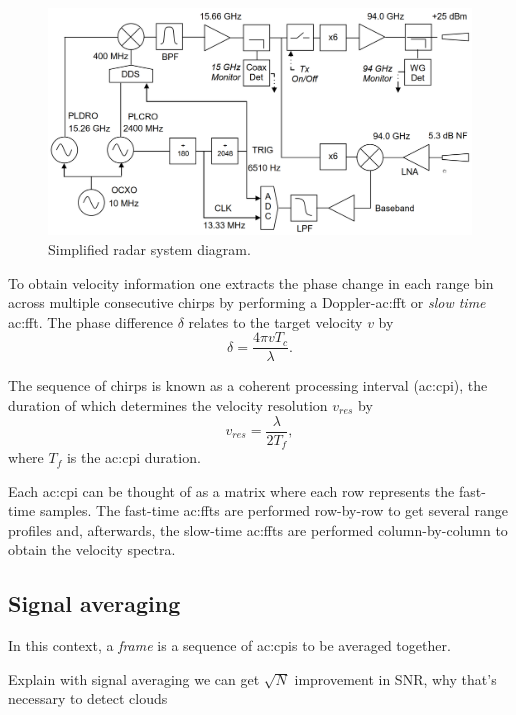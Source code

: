 \documentclass{article}
\begin{document}
\begin{figure}
	\centering
	\includegraphics[width=\textwidth]{radar-diagram}
	\caption{Simplified radar system diagram.\supercite{Radar}}
	\label{fig:RadarDiagram}
\end{figure}

To obtain velocity information one extracts the phase change in each range bin across multiple consecutive chirps by performing a Doppler-\acrshort{ac:fft} or \textit{slow time} \acrshort{ac:fft}.
The phase difference \(\delta\) relates to the target velocity \(v\) by\supercite{TIFMCWDoppler}
\begin{equation}
	\delta = \frac{4 \pi v T_c}{\lambda}.
\end{equation}

The sequence of chirps is known as a coherent processing interval (\acrshort{ac:cpi}), the duration of which determines the velocity resolution \(v_{res}\) by
\begin{equation}
	v_{res} = \frac{\lambda}{2 T_f},
\end{equation}
where \(T_f\) is the \acrshort{ac:cpi} duration.

Each \acrshort{ac:cpi} can be thought of as a matrix where each row represents the fast-time samples. The fast-time \acrshort{ac:fft}s are performed row-by-row to get several range profiles and, afterwards, the slow-time \acrshort{ac:fft}s are performed column-by-column to obtain the velocity spectra.

\subsection{Signal averaging}
In this context, a \textit{frame} is a sequence of \acrshort{ac:cpi}s to be averaged together. 

Explain with signal averaging we can get \(\sqrt{N}\) improvement in SNR, why that's necessary to detect clouds
\end{document}
